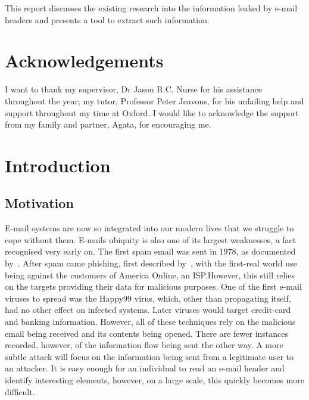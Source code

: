 \documentclass[twoside,10pt]{scrreprt}
\begin{document}
    This report discusses the existing research into the information leaked by
    e-mail headers and presents a tool to extract such information.

    \chapter*{Acknowledgements}

    I want to thank my supervisor, Dr Jason R.C. Nurse for his assistance
    throughout the year; my tutor, Professor Peter Jeavons, for his unfailing
    help and support throughout my time at Oxford.  I would like to acknowledge
    the support from my family and partner, Agata, for encouraging me.

    \tableofcontents \listoftables \listoffigures \listofalgorithms

    \chapter{Introduction}

    \section{Motivation}

    E-mail systems are now so integrated into our modern lives that we struggle to
    cope without them.  E-mails ubiquity is also one of its largest weaknesses, a
    fact recognised very early on.  The first spam email was sent in 1978, as
    documented by~\cite{templeton}.  After spam came phishing, first described
    by~\cite{felix1987system}, with the first-real world use being against the
    customers of America Online, an ISP.\@  However, this still relies on the
    targets providing their data for malicious purposes. One of the first e-mail
    viruses to spread was the Happy99 virus, which, other than propagating itself,
    had no other effect on infected systems. Later viruses would target credit-card
    and banking information. However, all of these techniques rely on the malicious
    email being received and its contents being opened.  There are fewer instances
    recorded, however, of the information flow being sent the other way.  A more
    subtle attack will focus on the information being sent from a legitimate user to
    an attacker. It is easy enough for an individual to read an e-mail header and
    identify interesting elements, however, on a large scale, this quickly becomes
    more difficult.
\end{document}

